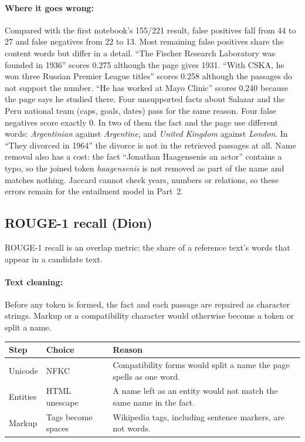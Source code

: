 \documentclass[12pt,a4paper]{article}
\begin{document}
\paragraph{Where it goes wrong:} Compared with the first notebook's 155/221 result, false positives fall from 44 to 27 and false negatives from 22 to 13. Most remaining false positives share the content words but differ in a detail. ``The Fischer Research Laboratory was founded in 1936'' scores 0.275 although the page gives 1931. ``With CSKA, he won three Russian Premier League titles'' scores 0.258 although the passages do not support the number. ``He has worked at Mayo Clinic'' scores 0.240 because the page says he studied there. Four unsupported facts about Salazar and the Peru national team (caps, goals, dates) pass for the same reason. Four false negatives score exactly 0. In two of them the fact and the page use different words: \textit{Argentinian} against \textit{Argentine}, and \textit{United Kingdom} against \textit{London}. In ``They divorced in 1964'' the divorce is not in the retrieved passages at all. Name removal also has a cost: the fact ``Jonathan Haagensenis an actor'' contains a typo, so the joined token \textit{haagensenis} is not removed as part of the name and matches nothing. Jaccard cannot check years, numbers or relations, so these errors remain for the entailment model in Part~2.

\subsection{ROUGE-1 recall (Dion)}
\label{sec:p1dion}

ROUGE-1 recall is an overlap metric: the share of a reference text's words that appear in a candidate text.

\paragraph{Text cleaning:}

Before any token is formed, the fact and each passage are repaired as character strings. Markup or a compatibility character would otherwise become a token or split a name.

\begin{center}
\small
\begin{tabular}{@{}llp{7.4cm}@{}}
\toprule
Step & Choice & Reason \\
\midrule
Unicode & NFKC & Compatibility forms would split a name the page spells as one word. \\
Entities & HTML unescape & A name left as an entity would not match the same name in the fact. \\
Markup & Tags become spaces & Wikipedia tags, including sentence markers, are not words. \\
\bottomrule
\end{tabular}
\end{center}
\end{document}
